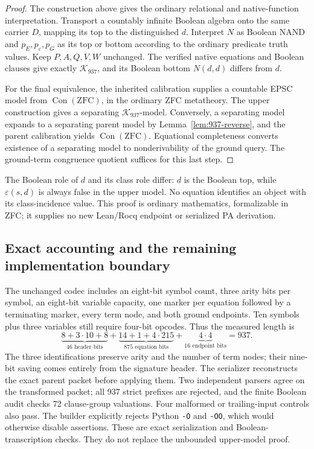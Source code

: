 \begin{proof}
The construction above gives the ordinary relational and native-function
interpretation.  Transport a countably infinite Boolean algebra onto
the same carrier \(D\), mapping its top to the distinguished \(d\).
Interpret \(N\) as Boolean NAND and \(p_E,p_\varepsilon,p_G\)
as its top or bottom according to the ordinary predicate truth values.
Keep \(P,A,Q,V,W\) unchanged.  The verified native equations and
Boolean clauses give exactly \(\mathcal K_{937}\), and its
Boolean bottom \(N(d,d)\) differs from \(d\).

For the final equivalence, the inherited calibration supplies a
countable EPSC model from \(\operatorname{Con}(\mathrm{ZFC})\),
in the ordinary ZFC metatheory.  The upper construction gives a
separating \(\mathcal K_{937}\)-model.  Conversely, a separating
model expands to a separating parent model by
Lemma~\ref{lem:937-reverse}, and the parent calibration yields
\(\operatorname{Con}(\mathrm{ZFC})\).
Equational completeness converts existence of a separating model
to nonderivability of the ground query.  The ground-term congruence
quotient suffices for this last step.
\end{proof}

The Boolean role of \(d\) and its class role differ:
\(d\) is the Boolean top, while \(\varepsilon(s,d)\) is always
false in the upper model.  No equation identifies an object with
its class-incidence value.  This proof is ordinary mathematics,
formalizable in ZFC; it supplies no new Lean/Rocq endpoint or
serialized PA derivation.

\subsection{Exact accounting and the remaining implementation boundary}

The unchanged codec includes an eight-bit symbol count, three arity
bits per symbol, an eight-bit variable capacity, one marker per
equation followed by a terminating marker, every term node, and both
ground endpoints.  Ten symbols plus three variables still require
four-bit opcodes.  Thus the measured length is
\[
 \underbrace{8+3\cdot10+8}_{46\text{ header bits}}
 +\underbrace{14+1+4\cdot215}_{875\text{ equation bits}}
 +\underbrace{4\cdot4}_{16\text{ endpoint bits}}
 =\boxed{937}.
\]
The three identifications preserve arity and the number of term
nodes; their nine-bit saving comes entirely from the signature header.
The serializer reconstructs the exact parent packet before applying
them.  Two independent parsers agree on the transformed packet;
all 937 strict prefixes are rejected, and the finite Boolean audit
checks 72 clause-group valuations.  Four malformed or trailing-input
controls also pass.  The builder explicitly rejects Python
\texttt{-O} and \texttt{-OO}, which would otherwise disable assertions.
These are exact serialization and Boolean-transcription checks.
They do not replace the unbounded upper-model proof.

